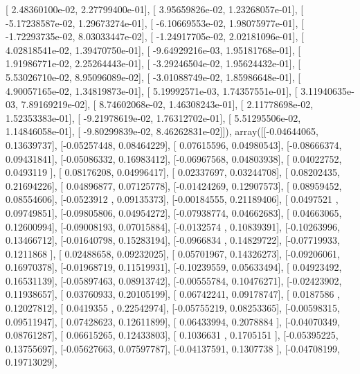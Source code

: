 \documentclass{article}
\begin{document}
       [  2.48360100e-02,   2.27799400e-01],
       [  3.95659826e-02,   1.23268057e-01],
       [ -5.17238587e-02,   1.29673274e-01],
       [ -6.10669553e-02,   1.98075977e-01],
       [ -1.72293735e-02,   8.03033447e-02],
       [ -1.24917705e-02,   2.02181096e-01],
       [  4.02818541e-02,   1.39470750e-01],
       [ -9.64929216e-03,   1.95181768e-01],
       [  1.91986771e-02,   2.25264443e-01],
       [ -3.29246504e-02,   1.95624432e-01],
       [  5.53026710e-02,   8.95096089e-02],
       [ -3.01088749e-02,   1.85986648e-01],
       [  4.90057165e-02,   1.34819873e-01],
       [  5.19992571e-03,   1.74357551e-01],
       [  3.11940635e-03,   7.89169219e-02],
       [  8.74602068e-02,   1.46308243e-01],
       [  2.11778698e-02,   1.52353383e-01],
       [ -9.21978619e-02,   1.76312702e-01],
       [  5.51295506e-02,   1.14846058e-01],
       [ -9.80299839e-02,   8.46262831e-02]]), array([[-0.04644065,  0.13639737],
       [-0.05257448,  0.08464229],
       [ 0.07615596,  0.04980543],
       [-0.08666374,  0.09431841],
       [-0.05086332,  0.16983412],
       [-0.06967568,  0.04803938],
       [ 0.04022752,  0.0493119 ],
       [ 0.08176208,  0.04996417],
       [ 0.02337697,  0.03244708],
       [ 0.08202435,  0.21694226],
       [ 0.04896877,  0.07125778],
       [-0.01424269,  0.12907573],
       [ 0.08959452,  0.08554606],
       [-0.0523912 ,  0.09135373],
       [-0.00184555,  0.21189406],
       [ 0.0497521 ,  0.09749851],
       [-0.09805806,  0.04954272],
       [-0.07938774,  0.04662683],
       [ 0.04663065,  0.12600994],
       [-0.09008193,  0.07015884],
       [-0.0132574 ,  0.10839391],
       [-0.10263996,  0.13466712],
       [-0.01640798,  0.15283194],
       [-0.0966834 ,  0.14829722],
       [-0.07719933,  0.1211868 ],
       [ 0.02488658,  0.09232025],
       [ 0.05701967,  0.14326273],
       [-0.09206061,  0.16970378],
       [-0.01968719,  0.11519931],
       [-0.10239559,  0.05633494],
       [ 0.04923492,  0.16531139],
       [-0.05897463,  0.08913742],
       [-0.00555784,  0.10476271],
       [-0.02423902,  0.11938657],
       [ 0.03760933,  0.20105199],
       [ 0.06742241,  0.09178747],
       [ 0.0187586 ,  0.12027812],
       [ 0.0419355 ,  0.22542974],
       [-0.05755219,  0.08253365],
       [-0.00598315,  0.09511947],
       [ 0.07428623,  0.12611899],
       [ 0.06433994,  0.2078884 ],
       [-0.04070349,  0.08761287],
       [ 0.06615265,  0.12433803],
       [ 0.1036631 ,  0.1705151 ],
       [-0.05395225,  0.13755697],
       [-0.05627663,  0.07597787],
       [-0.04137591,  0.1307738 ],
       [-0.04708199,  0.19713029],
\end{document}
